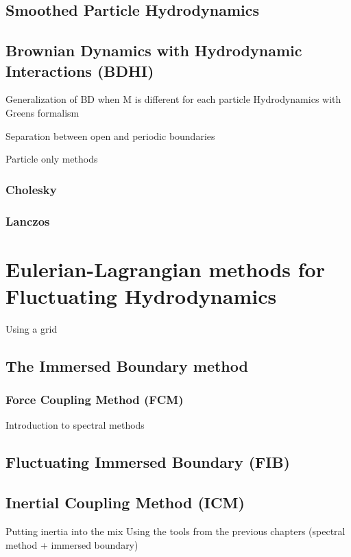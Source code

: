 \documentclass[ twoside,openright,titlepage,numbers=noenddot,%
headinclude,footinclude,cleardoublepage=empty,abstract=on,
BCOR=5mm,paper=a4,fontsize=11pt, dvipsnames
]{scrreprt}
\begin{document}
\section{Smoothed Particle Hydrodynamics}

\section{Brownian Dynamics with Hydrodynamic Interactions (BDHI)}
Generalization of BD when M is different for each particle
Hydrodynamics with Greens formalism

Separation between open and periodic boundaries

Particle only methods

\subsection{Cholesky}

\subsection{Lanczos}

\chapter{Eulerian-Lagrangian methods for Fluctuating Hydrodynamics}
Using a grid

\section{The Immersed Boundary method}

\subsection{Force Coupling Method (FCM)}

Introduction to spectral methods


\section{Fluctuating Immersed Boundary (FIB)}


\section{Inertial Coupling Method (ICM)}

Putting inertia into the mix
Using the tools from the previous chapters (spectral method + immersed boundary)
\end{document}

